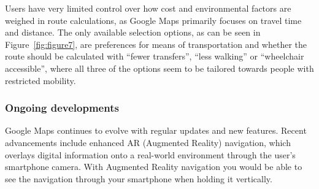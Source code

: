 Users have very limited control over how cost and environmental factors are weighed in route calculations, as Google
Maps primarily focuses on travel time and distance.
The only available selection options, as can be seen in Figure~\ref{fig:figure7}, are preferences for means of
transportation and whether the route should be calculated with ``fewer transfers'', ``less walking'' or ``wheelchair
accessible'', where all three of the options seem to be tailored towards people with restricted mobility.

\subsubsection{Ongoing developments}\label{subsec:ongoing-developments}

Google Maps continues to evolve with regular updates and new features.
Recent advancements include enhanced AR (Augmented Reality) navigation, which overlays digital information onto
a real-world environment through the user's smartphone camera.
With Augmented Reality navigation you would be able to see the navigation through your smartphone when holding it
vertically. \cite{googlemapsAR2023}
